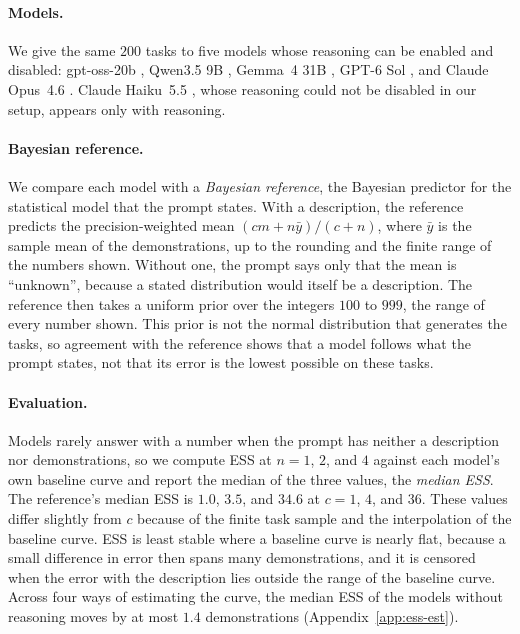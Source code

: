 \documentclass{article}
\theoremstyle{definition}
\begin{document}
\paragraph{Models.}
We give the same $200$ tasks to five models whose reasoning can be enabled and disabled: gpt-oss-20b \citep{openai2025}, Qwen3.5 9B \citep{qwen35}, Gemma~4 31B \citep{gemma4}, GPT-6 Sol \citep{openai2026sol}, and Claude Opus~4.6 \citep{anthropic2026opus}. Claude Haiku~5.5 \citep{anthropic2026haiku}, whose reasoning could not be disabled in our setup, appears only with reasoning.

\paragraph{Bayesian reference.}
We compare each model with a \emph{Bayesian reference}, the Bayesian predictor for the statistical model that the prompt states. With a description, the reference predicts the precision-weighted mean $(cm+n\bar y)/(c+n)$, where $\bar y$ is the sample mean of the demonstrations, up to the rounding and the finite range of the numbers shown. Without one, the prompt says only that the mean is “unknown”, because a stated distribution would itself be a description. The reference then takes a uniform prior over the integers $100$ to $999$, the range of every number shown. This prior is not the normal distribution that generates the tasks, so agreement with the reference shows that a model follows what the prompt states, not that its error is the lowest possible on these tasks.

\paragraph{Evaluation.}
Models rarely answer with a number when the prompt has neither a description nor demonstrations, so we compute ESS at $n=1$, $2$, and $4$ against each model's own baseline curve and report the median of the three values, the \emph{median ESS}. The reference's median ESS is $1.0$, $3.5$, and $34.6$ at $c=1$, $4$, and $36$. These values differ slightly from $c$ because of the finite task sample and the interpolation of the baseline curve. ESS is least stable where a baseline curve is nearly flat, because a small difference in error then spans many demonstrations, and it is censored when the error with the description lies outside the range of the baseline curve. Across four ways of estimating the curve, the median ESS of the models without reasoning moves by at most $1.4$ demonstrations (Appendix~\ref{app:ess-est}).
\end{document}
